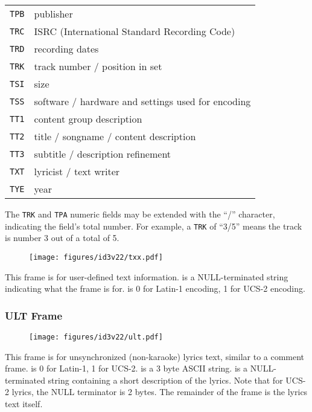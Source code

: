 \begin{table}[h]
{\begin{tabular}{|r|l|}
\texttt{TPB} & publisher \\
\texttt{TRC} & ISRC (International Standard Recording Code) \\
\texttt{TRD} & recording dates \\
\texttt{TRK} & track number / position in set \\
\texttt{TSI} & size \\
\texttt{TSS} & software / hardware and settings used for encoding \\
\texttt{TT1} & content group description \\
\texttt{TT2} & title / songname / content description \\
\texttt{TT3} & subtitle / description refinement \\
\texttt{TXT} & lyricist / text writer \\
\texttt{TYE} & year \\
\hline
\end{tabular}
}
\end{table}
\par
The \texttt{TRK} and \texttt{TPA} numeric fields may be extended
with the ``/'' character, indicating the field's total number.
For example, a \texttt{TRK} of ``3/5'' means the track is number
3 out of a total of 5.

\clearpage

\begin{figure}[h]
\texttt{[image: figures/id3v22/txx.pdf]}
\end{figure}
This frame is for user-defined text information.
 is a NULL-terminated string indicating
what the frame is for.
 is 0 for Latin-1 encoding, 1 for UCS-2 encoding.

\subsubsection{ULT Frame}
\begin{figure}[h]
\texttt{[image: figures/id3v22/ult.pdf]}
\end{figure}
This frame is for unsynchronized (non-karaoke) lyrics text,
similar to a comment frame.
 is 0 for Latin-1, 1 for UCS-2.
 is a 3 byte ASCII string.
 is a NULL-terminated string
containing a short description of the lyrics.
Note that for UCS-2 lyrics, the NULL terminator is 2 bytes.
The remainder of the frame is the lyrics text itself.

\clearpage

